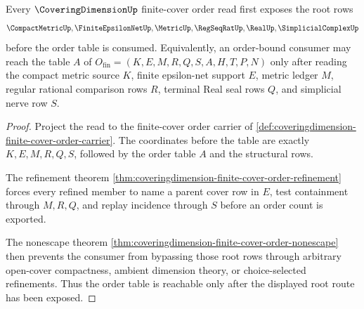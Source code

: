 \begin{theorem}
\label{thm:covering-dimension-finite-cover-order-root}
Every $\CoveringDimensionUp$ finite-cover order read first exposes the root rows
$$
\CompactMetricUp,\FiniteEpsilonNetUp,\MetricUp,\RegSeqRatUp,\RealUp,\SimplicialComplexUp
$$
before the order table is consumed. Equivalently, an order-bound consumer may reach the table $A$ of $O_{\mathrm{fin}}=(K,E,M,R,Q,S,A,H,T,P,N)$ only after reading the compact metric source $K$, finite epsilon-net support $E$, metric ledger $M$, regular rational comparison rows $R$, terminal Real seal rows $Q$, and simplicial nerve row $S$.
\end{theorem}
\begin{proof}
Project the read to the finite-cover order carrier of \autoref{def:coveringdimension-finite-cover-order-carrier}. The coordinates before the table are exactly $K,E,M,R,Q,S$, followed by the order table $A$ and the structural rows.

The refinement theorem \autoref{thm:coveringdimension-finite-cover-order-refinement} forces every refined member to name a parent cover row in $E$, test containment through $M,R,Q$, and replay incidence through $S$ before an order count is exported.

The nonescape theorem \autoref{thm:coveringdimension-finite-cover-order-nonescape} then prevents the consumer from bypassing those root rows through arbitrary open-cover compactness, ambient dimension theory, or choice-selected refinements. Thus the order table is reachable only after the displayed root route has been exposed.
\end{proof}

